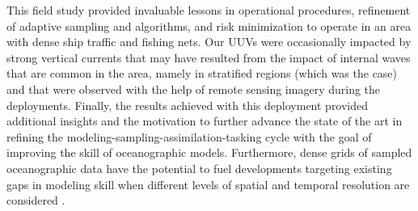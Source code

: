 This field study provided invaluable lessons in operational procedures, refinement of adaptive sampling and algorithms, and risk minimization to operate in an area with dense ship traffic and fishing nets. Our UUVs were occasionally impacted by strong vertical currents that may have resulted from the impact of internal waves that are common in the area, namely in stratified regions (which was the case) and that were observed with the help of remote sensing imagery during the deployments. 
Finally, the results achieved with this deployment provided additional insights and the motivation to further advance the state of the art in refining the modeling-sampling-assimilation-tasking cycle with the goal of improving the skill of oceanographic models. Furthermore, dense grids of sampled oceanographic data have the potential to fuel developments targeting existing gaps in modeling skill when different levels of spatial and temporal resolution are considered \cite{Balaji_2022}. 
